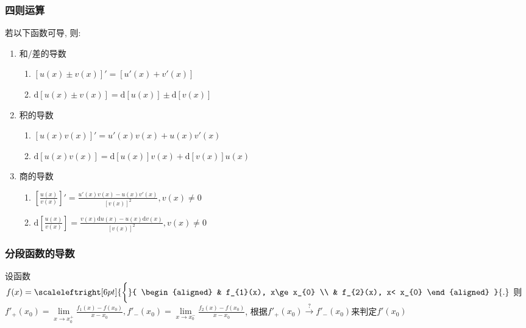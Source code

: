 \subsubsection{四则运算}
若以下函数可导, 则:
\begin{enumerate}
    \item 和/差的导数
          \begin{enumerate}
              \item $ [u(x)\pm v(x)]'=[u'(x)+v'(x)] $
              \item $ \mathrm{d}[u(x)\pm v(x)]=\mathrm{d}[u(x)]\pm \mathrm{d}[v(x)] $
          \end{enumerate}
    \item 积的导数
          \begin{enumerate}
              \item $ [u(x)v(x)]'=u'(x)v(x)+u(x)v'(x) $
              \item $ \mathrm{d}[u(x)v(x)]=\mathrm{d}[u(x)]v(x)+\mathrm{d}[v(x)]u(x) $
          \end{enumerate}
    \item 商的导数
          \begin{enumerate}
              \item $ [\frac{u(x)}{v(x)}]'=\frac{u'(x)v(x)-u(x)v'(x)}{[v(x)]^{2}}, v(x)\neq 0 $
              \item $ \mathrm{d}[\frac{u(x)}{v(x)}]=\frac{v(x)\mathrm{d}u(x)-u(x)\mathrm{d}v(x)}{[v(x)]^{2}}, v(x)\neq 0 $
          \end{enumerate}
\end{enumerate}
\subsubsection{分段函数的导数}
设函数$ f(x)=\scaleleftright[6pt]{\biggl\{}{
        \begin{aligned}
             & f_{1}(x), x\ge x_{0} \\
             & f_{2}(x), x< x_{0}
        \end{aligned} }{.} $
则$ f'_{+}(x_{0})=\lim\limits_{x\rightarrow x_{0}^{+}}\frac{f_{1}(x)-f(x_{0})}{x-x_{0}}, f'_{-}(x_{0})=\lim\limits_{x\rightarrow x_{0}^{-}}\frac{f_{2}(x)-f(x_{0})}{x-x_{0}} $, 根据$ f'_{+}(x_{0})\xrightarrow{?}f'_{-}(x_{0}) $来判定$ f'(x_{0}) $
